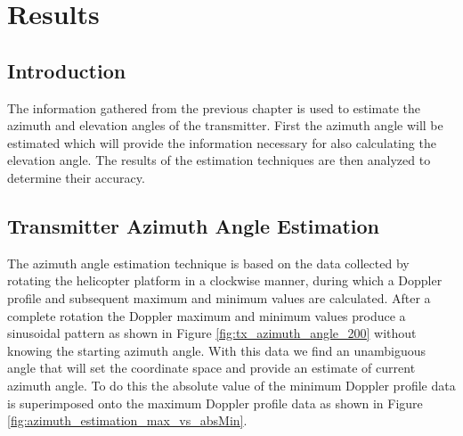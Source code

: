 \chapter{Results} \label{ch:results}

\section{Introduction}
The information gathered from the previous chapter is used to estimate the azimuth and elevation angles of the transmitter. First the azimuth angle will be estimated which will provide the information necessary for also calculating the elevation angle. The results of the estimation techniques are then analyzed to determine their accuracy.


\section{Transmitter Azimuth Angle Estimation} \label{sec:transmitter_azimuth_angle_estimation}
The azimuth angle estimation technique is based on the data collected by rotating the helicopter platform in a clockwise manner, during which a Doppler profile and subsequent maximum and minimum values are calculated. After a complete rotation the Doppler maximum and minimum values produce a sinusoidal pattern as shown in Figure \ref{fig:tx_azimuth_angle_200} without knowing the starting azimuth angle. With this data we find an unambiguous angle that will set the coordinate space and provide an estimate of current azimuth angle. To do this the absolute value of the minimum Doppler profile data is superimposed onto the maximum Doppler profile data as shown in Figure \ref{fig:azimuth_estimation_max_vs_absMin}.

